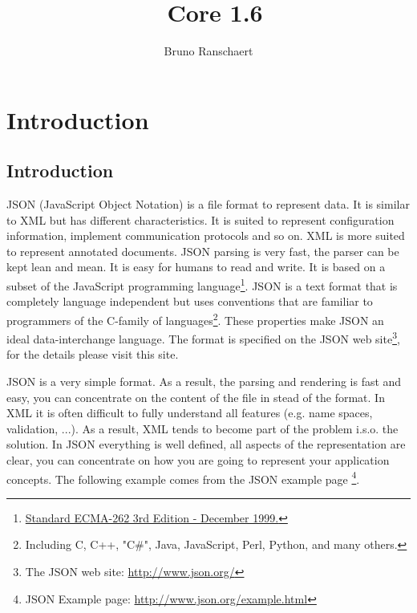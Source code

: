 \documentclass[a4paper]{article}
\title{\jtools\ Core 1.6}
\author{Bruno Ranschaert}
\newcommand{\java}{Java}
\begin{document}
\maketitle
\tableofcontents

\section{Introduction}
\subsection{Introduction}

JSON (JavaScript Object Notation) is a file format to represent data. It is similar to XML but has different characteristics. It is suited to represent configuration information, implement communication protocols and so on.  XML is more suited to represent annotated documents. 
JSON parsing is very fast, the parser can be kept lean and mean. It is easy for humans to read and write.  
It is based on a subset of the JavaScript programming language\footnote{\href{http://www.ecma-international.org/publications/standards/Ecma-262.htm}{Standard ECMA-262 3rd Edition - December 1999.}}.  JSON is a text format that is completely language independent but uses conventions that are familiar to programmers of the C-family of languages\footnote{Including C, C++, "C\#", \java, JavaScript, Perl, Python, and many others.}.  These properties make JSON an ideal data-interchange language. 
The format is specified on the JSON web site\footnote{The JSON web site: \url{http://www.json.org/}}, for the details please visit this site.

JSON is a very simple format. As a result, the parsing and rendering is fast and easy, you can concentrate on  the content of the file in stead of the format.  
In XML it is often difficult to fully understand all features (e.g. name spaces, validation, ...).  
As a result, XML tends to become part of the problem i.s.o. the solution. 
In JSON everything is well defined, all aspects of the representation are clear, you can concentrate on how you are going to represent your application concepts. The following example comes from the JSON example page  \footnote{JSON Example page: \url{http://www.json.org/example.html}}.
\end{document}
